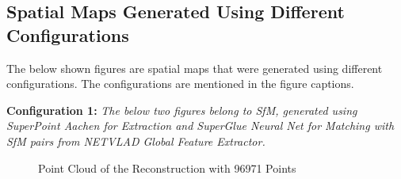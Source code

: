 \documentclass[sigconf]{acmart}
\begin{document}
\subsection{Spatial Maps Generated Using Different Configurations}
The below shown figures are spatial maps that were generated using different configurations. The configurations are mentioned in the figure captions.

\textbf{Configuration 1: }
\textit{The below two figures belong to SfM, generated using SuperPoint Aachen for Extraction and SuperGlue Neural Net for Matching with SfM pairs from NETVLAD Global Feature Extractor.}

\begin{figure}[H]%
    \centering
    \qquad
    \caption{Point Cloud of the Reconstruction with 96971 Points}
    \label{fig:SPSGGE}%
\end{figure}
\end{document}
